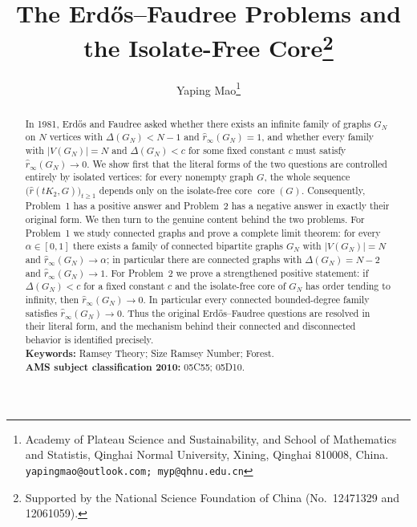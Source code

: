 \documentclass[11pt]{article}
\newcommand{\sr}{\hat r}
\newcommand{\sri}{\hat r_{\infty}}
\newcommand{\core}{\operatorname{core}}
\theoremstyle{definition}
\theoremstyle{remark}
\begin{document}
\title{\textbf{The Erd\H{o}s--Faudree Problems and the Isolate-Free Core\footnote{Supported by the National Science Foundation of China
        (No.~12471329 and 12061059).}}}


\author{Yaping Mao\footnote{Academy of Plateau
Science and Sustainability, and School of
Mathematics and Statistis, Qinghai Normal University, Xining,
Qinghai 810008, China. {\tt yapingmao@outlook.com; myp@qhnu.edu.cn}}}

\date{}
\maketitle




\begin{abstract}
In 1981, Erd\H{o}s and Faudree asked whether there exists an infinite family of graphs
$G_N$ on $N$ vertices with $\Delta(G_N)<N-1$ and $\sri(G_N)=1$, and whether every
family with $|V(G_N)|=N$ and $\Delta(G_N)<c$ for some fixed constant $c$ must satisfy
$\sri(G_N)\to 0$. We show first that the literal forms of the two questions are controlled
entirely by isolated vertices: for every nonempty graph $G$, the whole sequence
$\bigl(\sr(tK_2,G)\bigr)_{t\ge 1}$ depends only on the isolate-free core $\core(G)$.
Consequently, Problem~1 has a positive answer and Problem~2 has a negative answer in
exactly their original form.
We then turn to the genuine content behind the two problems. For Problem~1 we study
connected graphs and prove a complete limit theorem: for every $\alpha\in[0,1]$ there
exists a family of connected bipartite graphs $G_N$ with $|V(G_N)|=N$ and
$\sri(G_N)\to\alpha$; in particular there are connected graphs with $\Delta(G_N)=N-2$ and
$\sri(G_N)\to 1$. For Problem~2 we prove a strengthened positive statement: if
$\Delta(G_N)<c$ for a fixed constant $c$ and the isolate-free core of $G_N$ has order tending
to infinity, then $\sri(G_N)\to 0$. In particular every connected bounded-degree family
satisfies $\sri(G_N)\to 0$. Thus the original Erd\H{o}s--Faudree questions are resolved in
their literal form, and the mechanism behind their connected and disconnected behavior is
identified precisely.\\[2mm]
{\bf Keywords:} Ramsey Theory; Size Ramsey Number; Forest.\\[2mm]
{\bf AMS subject classification 2010:} 05C55; 05D10.
\end{abstract}

\end{document}
